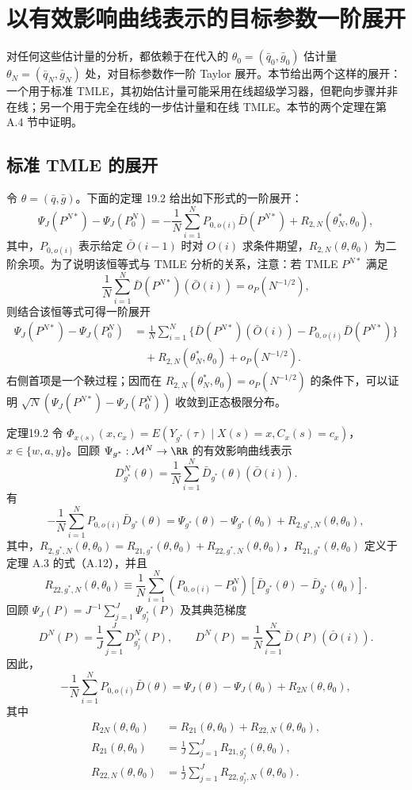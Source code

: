 \section{以有效影响曲线表示的目标参数一阶展开}

对任何这些估计量的分析，都依赖于在代入的 $\theta_0=(\bar q_0,\bar g_0)$ 估计量 $\theta_N=(\bar q_N,\bar g_N)$ 处，对目标参数作一阶 Taylor 展开。本节给出两个这样的展开：一个用于标准 TMLE，其初始估计量可能采用在线超级学习器，但靶向步骤并非在线；另一个用于完全在线的一步估计量和在线 TMLE。本节的两个定理在第 A.4 节中证明。

\subsection{标准 TMLE 的展开}

令 $\theta=(\bar q,\bar g)$。下面的定理 19.2 给出如下形式的一阶展开：
\[
 \Psi_J(P^{N*})-\Psi_J(P_0^N)
 =-\frac1N\sum_{i=1}^N P_{0,o(i)}\bar D(P^{N*})
 +R_{2,N}(\theta_N^*,\theta_0),
\]
其中，$P_{0,o(i)}$ 表示给定 $\bar O(i-1)$ 时对 $O(i)$ 求条件期望，$R_{2,N}(\theta,\theta_0)$ 为二阶余项。为了说明该恒等式与 TMLE 分析的关系，注意：若 TMLE $P^{N*}$ 满足
\[
 \frac1N\sum_{i=1}^N\bar D(P^{N*})(\bar O(i))=o_P(N^{-1/2}),
\]
则结合该恒等式可得一阶展开
\[
\begin{aligned}
 \Psi_J(P^{N*})-\Psi_J(P_0^N)
 &=\frac1N\sum_{i=1}^N
 \{\bar D(P^{N*})(\bar O(i))-P_{0,o(i)}\bar D(P^{N*})\}\\
 &\quad+R_{2,N}(\theta_N^*,\theta_0)+o_P(N^{-1/2}).
\end{aligned}
\]
右侧首项是一个鞅过程；因而在 $R_{2,N}(\theta_N^*,\theta_0)=o_P(N^{-1/2})$ 的条件下，可以证明 $\sqrt N(\Psi_J(P^{N*})-\Psi_J(P_0^N))$ 收敛到正态极限分布。

\begin{bookresult}{定理}{19.2}
令 $\Phi_{x(s)}(x,c_x)=E(Y_{g^*}(\tau)\mid X(s)=x,C_x(s)=c_x)$，$x\in\{w,a,y\}$。回顾 $\Psi_{g^*}:\mathcal M^N\to\RR$ 的有效影响曲线表示
\[
 D_{g^*}^N(\theta)=\frac1N\sum_{i=1}^N\bar D_{g^*}(\theta)(\bar O(i)).
\]
有
\[
 -\frac1N\sum_{i=1}^N P_{0,o(i)}\bar D_{g^*}(\theta)
 =\Psi_{g^*}(\theta)-\Psi_{g^*}(\theta_0)+R_{2,g^*,N}(\theta,\theta_0),
\]
其中，$R_{2,g^*,N}(\theta,\theta_0)=R_{21,g^*}(\theta,\theta_0)+R_{22,g^*,N}(\theta,\theta_0)$，$R_{21,g^*}(\theta,\theta_0)$ 定义于定理 A.3 的式（A.12），并且
\[
 R_{22,g^*,N}(\theta,\theta_0)
 \equiv\frac1N\sum_{i=1}^N(P_{0,o(i)}-P_0^N)
 [\bar D_{g^*}(\theta)-\bar D_{g^*}(\theta_0)].
\]
回顾 $\Psi_J(P)=J^{-1}\sum_{j=1}^J\Psi_{g_j^*}(P)$ 及其典范梯度
\[
 D^N(P)=\frac1J\sum_{j=1}^J D_{g_j^*}^N(P),
 \qquad D^N(P)=\frac1N\sum_{i=1}^N\bar D(P)(\bar O(i)).
\]
因此，
\[
 -\frac1N\sum_{i=1}^N P_{0,o(i)}\bar D(\theta)
 =\Psi_J(\theta)-\Psi_J(\theta_0)+R_{2N}(\theta,\theta_0),
\]
其中
\[
\begin{aligned}
 R_{2N}(\theta,\theta_0)&=R_{21}(\theta,\theta_0)+R_{22,N}(\theta,\theta_0),\\
 R_{21}(\theta,\theta_0)&=\frac1J\sum_{j=1}^J R_{21,g_j^*}(\theta,\theta_0),\\
 R_{22,N}(\theta,\theta_0)&=\frac1J\sum_{j=1}^J R_{22,g_j^*,N}(\theta,\theta_0).
\end{aligned}
\]
\end{bookresult}

